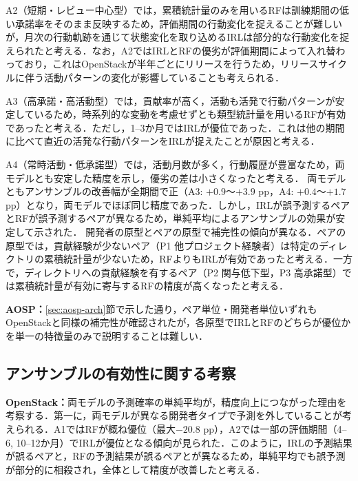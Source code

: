 \documentclass[submit,noauthor,ses,dvipdfmx]{ipsj}
\begin{document}
A2（短期・レビュー中心型）では，累積統計量のみを用いるRFは訓練期間の低い承諾率をそのまま反映するため，評価期間の行動変化を捉えることが難しいが，月次の行動軌跡を通じて状態変化を取り込めるIRLは部分的な行動変化を捉えられたと考える．なお，A2ではIRLとRFの優劣が評価期間によって入れ替わっており，これはOpenStackが半年ごとにリリースを行うため，リリースサイクルに伴う活動パターンの変化が影響していることも考えられる．

A3（高承諾・高活動型）では，貢献率が高く，活動も活発で行動パターンが安定しているため，時系列的な変動を考慮せずとも類型統計量を用いるRFが有効であったと考える．ただし，1--3か月ではIRLが優位であった．これは他の期間に比べて直近の活発な行動パターンをIRLが捉えたことが原因と考える．

A4（常時活動・低承諾型）では，活動月数が多く，行動履歴が豊富なため，両モデルとも安定した精度を示し，優劣の差は小さくなったと考える．
両モデルともアンサンブルの改善幅が全期間で正（A3: $+0.9$〜$+3.9$ pp，A4: $+0.4$〜$+1.7$ pp）となり，両モデルでほぼ同じ精度であった．しかし，IRLが誤予測するペアとRFが誤予測するペアが異なるため，単純平均によるアンサンブルの効果が安定して示された．
開発者の原型とペアの原型で補完性の傾向が異なる．ペアの原型では，貢献経験が少ないペア（P1 他プロジェクト経験者）は特定のディレクトリの累積統計量が少ないため，RFよりもIRLが有効であったと考える．一方で，ディレクトリへの貢献経験を有するペア（P2 関与低下型，P3 高承諾型）では累積統計量が有効に寄与するRFの精度が高くなったと考える．

\noindent\textbf{AOSP：}\ref{sec:aosp-arch}節で示した通り，ペア単位・開発者単位いずれもOpenStackと同様の補完性が確認されたが，各原型でIRLとRFのどちらが優位かを単一の特徴量のみで説明することは難しい．


\vspace{-5mm}
\subsection{アンサンブルの有効性に関する考察}
\noindent\textbf{OpenStack：}両モデルの予測確率の単純平均が，精度向上につながった理由を考察する．第一に，両モデルが異なる開発者タイプで予測を外していることが考えられる．A1ではRFが概ね優位（最大$-20.8$ pp），A2では一部の評価期間（4--6, 10--12か月）でIRLが優位となる傾向が見られた．このように，IRLの予測結果が誤るペアと，RFの予測結果が誤るペアとが異なるため，単純平均でも誤予測が部分的に相殺され，全体として精度が改善したと考える．
\end{document}
